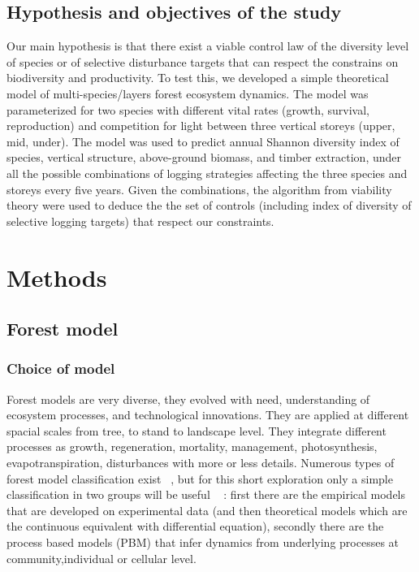 \documentclass{article}
\begin{document}
\subsection{Hypothesis and objectives of the study}

Our main hypothesis is that there exist a viable control law of the diversity level of species or of selective disturbance targets that can respect the constrains on biodiversity and productivity. To test this, we developed a simple theoretical model of multi-species/layers forest ecosystem dynamics. The model was parameterized for two species with different vital rates (growth, survival, reproduction) and competition for light between three vertical storeys (upper, mid, under). The model was used to predict annual Shannon diversity index of species, vertical structure, above-ground biomass, and timber extraction, under all the possible combinations of logging strategies affecting the three species and storeys every five years.  Given the combinations, the algorithm from viability theory were used to deduce the the set of controls (including index of diversity of selective logging targets) that respect our constraints.

\section{Methods}

\subsection{Forest model}

\subsubsection{Choice of model}

Forest models are very diverse, they evolved with need, understanding of ecosystem processes, and technological innovations. They are applied at different spacial scales from tree, to stand to landscape level. They integrate different processes as growth, regeneration, mortality, management, photosynthesis, evapotranspiration, disturbances with more or less details. Numerous types of forest model classification exist ~\autocite{porteModellingMixedForest2002}, but for this short exploration only a simple classification in two groups will be useful ~\autocite{fontesModelsSupportingForest2011} : first there are the empirical models that are developed on experimental data (and then theoretical models which are the continuous equivalent with differential equation), secondly there are the process based models (PBM) that infer dynamics from underlying processes at community,individual or cellular level. 
\end{document}
